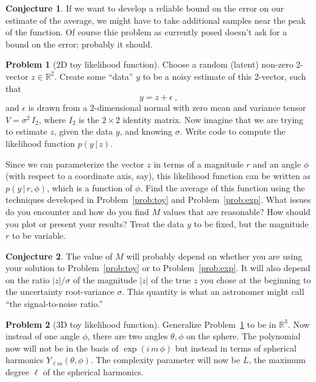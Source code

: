 \documentclass{article}
\newcommand{\given}{\,|\,}
\theoremstyle{definition}
\newcommand{\problemname}{Problem}
\newtheorem{problem}{\problemname}
\newcommand{\probref}[1]{\problemname~\ref{#1}}
\newtheorem{conjecture}{Conjecture}[problem]
\theoremstyle{definition}
\begin{document}
\begin{conjecture}
If we want to develop a reliable bound on the error on our estimate of the average, we might have to take additional samples near the peak of the function.
Of course thie problem as currently posed doesn't ask for a bound on the error; probably it should.
\end{conjecture}

\begin{problem}[2D toy likelihood function]\label{prob:toylike}
Choose a random (latent) non-zero 2-vector $z\in\mathbb{R}^2$.
Create some ``data'' $y$ to be a noisy estimate of this 2-vector, such that
\begin{equation}
    y = z + \epsilon ~,
\end{equation}
and $\epsilon$ is drawn from a 2-dimensional normal with zero mean and variance tensor $V=\sigma^2\,I_2$, where $I_2$ is the $2\times 2$ identity matrix.
Now imagine that we are trying to estimate $z$, given the data $y$, and knowing $\sigma$.
Write code to compute the likelihood function $p(y\given z)$.

Since we can parameterize the vector $z$ in terms of a magnitude $r$ and an angle $\phi$ (with respect to a coordinate axis, say), this likelihood function can be written as $p(y\given r,\phi)$, which is a function of $\phi$.
Find the average of this function using the techniques developed in \probref{prob:toy} and \probref{prob:exp}.
What issues do you encounter and how do you find $M$ values that are reasonable?
How should you plot or present your results? Treat the data $y$ to be fixed, but the magnitude $r$ to be variable.
\end{problem}

\begin{conjecture}
The value of $M$ will probably depend on whether you are using your solution to \probref{prob:toy} or to \probref{prob:exp}.
It will also depend on the ratio $|z|/\sigma$ of the magnitude $|z|$ of the true $z$ you chose at the beginning to the uncertainty root-variance $\sigma$.
This quantity is what an astronomer might call ``the signal-to-noise ratio.''
\end{conjecture}

\begin{problem}[3D toy likelihood function]\label{prob:toylike3}
Generalize \probref{prob:toylike} to be in $\mathbb{R}^3$.
Now instead of one angle $\phi$, there are two angles $\theta,\phi$ on the sphere.
The polynomial now will not be in the basis of $\exp(i\,m\,\phi)$ but instead in terms of spherical harmonics $Y_{\ell m}(\theta,\phi)$.
The complexity parameter will now be $L$, the maximum degree $\ell$ of the spherical harmonics.
\end{problem}
\end{document}
